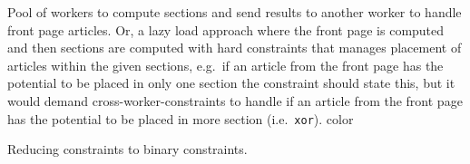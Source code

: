 
Pool of workers to compute sections and send results to another worker to handle front page articles. Or, a lazy load approach where the front page is computed and then sections are computed with hard constraints that manages placement of articles within the given sections, e.g.\ if an article from the front page has the potential to be placed in only one section the constraint should state this, but it would demand cross-worker-constraints to handle if an article from the front page has the potential to be placed in more section (i.e.\ \texttt{xor}). color

Reducing constraints to binary constraints.


